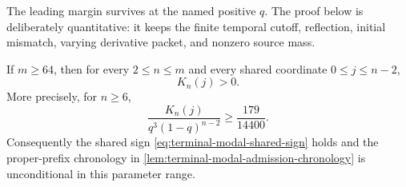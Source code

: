 The leading margin survives at the named positive $q$.  The proof below is
deliberately quantitative: it keeps the finite temporal cutoff, reflection,
initial mismatch, varying derivative packet, and nonzero source mass.

\begin{lemma}
\label{lem:terminal-modal-finite-correction-sign}
If $m\ge64$, then for every $2\le n\le m$ and every shared coordinate
$0\le j\le n-2$,
\begin{equation}
 K_n(j)>0.
 \label{eq:terminal-modal-finite-correction-sign}
\end{equation}
More precisely, for $n\ge6$,
\begin{equation}
 \frac{K_n(j)}{q^3(1-q)^{n-2}}
 \ge \frac{179}{14400}.
 \label{eq:terminal-modal-finite-correction-margin}
\end{equation}
Consequently the shared sign \eqref{eq:terminal-modal-shared-sign} holds and
the proper-prefix chronology in
\cref{lem:terminal-modal-admission-chronology} is unconditional in this
parameter range.
\end{lemma}

